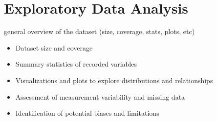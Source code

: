 \chapter{Exploratory Data Analysis}
general overview of the dataset (size, coverage, stats, plots, etc)
\begin{itemize}
\item Dataset size and coverage
\item Summary statistics of recorded variables
\item Visualizations and plots to explore distributions and relationships
\item Assessment of measurement variability and missing data
\item Identification of potential biases and limitations
\end{itemize}